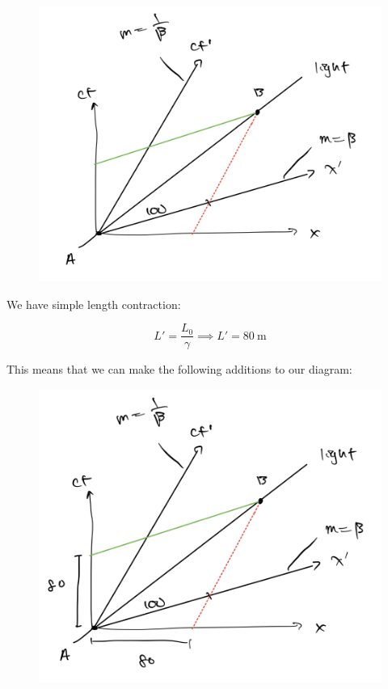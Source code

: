 \documentclass{article}
\theoremstyle{definition}
\numberwithin{equation}{section}
\numberwithin{definition}{section}
\begin{document}
	\begin{figure}[H]
		\centering
		\includegraphics[scale=0.3]{Q3-1.jpg}
		\end{figure}
	
	We have simple length contraction:
	
	\[ L' = \frac{L_0}{\gamma} \implies L' = 80 \ \text{m}\]
	
	This means that we can make the following additions to our diagram:
	
	
	\begin{figure}[H]
		\centering
		\includegraphics[scale=0.3]{Q3-2.jpg}
		\end{figure}
	
\end{document}
